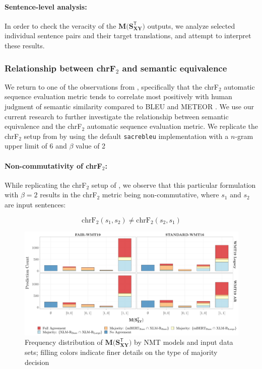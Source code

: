 \documentclass[11pt,a4paper]{article}
\begin{document}
\paragraph{Sentence-level analysis:} In order to check the veracity of the
$\mathbf{M(S_{XY}^{\mathsf{T}}})$ outputs, we analyze selected individual
sentence pairs and their target translations, and attempt to interpret these
results.

\subsubsection{Relationship between chrF$_2$ and semantic equivalence}

We return to one of the observations from \citet{michel2019evaluation},
specifically that the chrF$_2$ automatic sequence evaluation metric
\cite{popovic2015chrf} tends to correlate most positively with human judgment of
semantic similarity compared to BLEU \cite{papineni2002bleu} and METEOR
\cite{denkowski2014meteor}. We use our current research to further investigate
the relationship between semantic equivalence and the chrF$_2$ automatic
sequence evaluation metric. We replicate the chrF$_2$ setup from
\citet{michel2019evaluation} by using the default \texttt{sacrebleu}
implementation \cite{post-2018-call} with a $n$-gram upper limit of 6 and
$\beta$ value of 2

\paragraph{Non-commutativity of chrF$_2$:} While replicating the chrF$_2$ setup
of \citet{michel2019evaluation}, we observe that this particular formulation
with $\beta = 2$ results in the chrF$_2$ metric being non-commutative, where
$s_1$ and $s_2$ are input sentences:

\begin{equation}
  \text{chrF}_{2}(s_1,s_2) \neq \text{chrF}_{2}(s_2,s_1)
\end{equation}

\begin{figure}
  \centering \includegraphics[trim={0cm 0cm 0cm
    0cm},clip,width=\textwidth]{paraphrase_detection_joint_decision.pdf}
  \caption{Frequency distribution of $\mathbf{M(S_{XY}^{\mathsf{T}}})$ by NMT
    models and input data sets; filling colors indicate finer details on the
    type of majority decision}
  \label{paraphrase_detection_joint_decision}
\end{figure}
\end{document}
